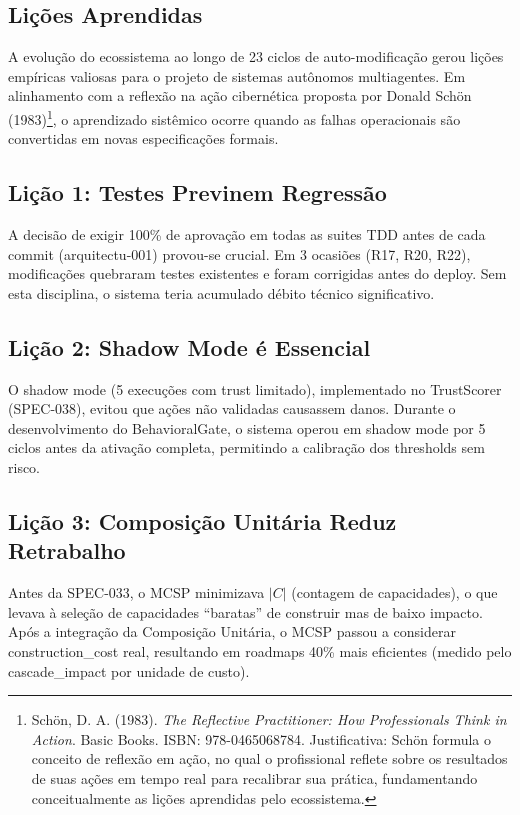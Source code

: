 \documentclass[12pt,a4paper,oneside]{abntex2}
\begin{document}
\begin{apendicesenv}
\section{Lições Aprendidas}

A evolução do ecossistema ao longo de 23 ciclos de auto-modificação gerou lições empíricas valiosas para o projeto de sistemas autônomos multiagentes. Em alinhamento com a reflexão na ação cibernética proposta por Donald Schön (1983)\footnote{Schön, D. A. (1983). \textit{The Reflective Practitioner: How Professionals Think in Action}. Basic Books. ISBN: 978-0465068784. Justificativa: Schön formula o conceito de reflexão em ação, no qual o profissional reflete sobre os resultados de suas ações em tempo real para recalibrar sua prática, fundamentando conceitualmente as lições aprendidas pelo ecossistema.}, o aprendizado sistêmico ocorre quando as falhas operacionais são convertidas em novas especificações formais.

\subsection{Lição 1: Testes Previnem Regressão}

A decisão de exigir 100\% de aprovação em todas as suites TDD antes de cada commit (arquitectu-001) provou-se crucial. Em 3 ocasiões (R17, R20, R22), modificações quebraram testes existentes e foram corrigidas antes do deploy. Sem esta disciplina, o sistema teria acumulado débito técnico significativo.

\subsection{Lição 2: Shadow Mode é Essencial}

O shadow mode (5 execuções com trust limitado), implementado no TrustScorer (SPEC-038), evitou que ações não validadas causassem danos. Durante o desenvolvimento do BehavioralGate, o sistema operou em shadow mode por 5 ciclos antes da ativação completa, permitindo a calibração dos thresholds sem risco.

\subsection{Lição 3: Composição Unitária Reduz Retrabalho}

Antes da SPEC-033, o MCSP minimizava $|C|$ (contagem de capacidades), o que levava à seleção de capacidades ``baratas'' de construir mas de baixo impacto. Após a integração da Composição Unitária, o MCSP passou a considerar construction\_cost real, resultando em roadmaps 40\% mais eficientes (medido pelo cascade\_impact por unidade de custo).


\end{apendicesenv}
\end{document}

